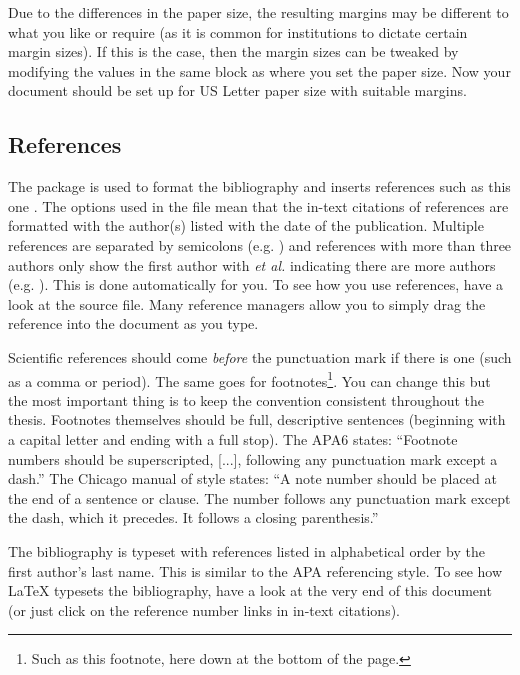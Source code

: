 Due to the differences in the paper size, the resulting margins may be different to what you like or require (as it is common for institutions to dictate certain margin sizes). If this is the case, then the margin sizes can be tweaked by modifying the values in the same block as where you set the paper size. Now your document should be set up for US Letter paper size with suitable margins.

\subsection{References}

The  package is used to format the bibliography and inserts references such as this one \parencite{Reference1}. The options used in the  file mean that the in-text citations of references are formatted with the author(s) listed with the date of the publication. Multiple references are separated by semicolons (e.g. \parencite{Reference2, Reference1}) and references with more than three authors only show the first author with \emph{et al.} indicating there are more authors (e.g. \parencite{Reference3}). This is done automatically for you. To see how you use references, have a look at the  source file. Many reference managers allow you to simply drag the reference into the document as you type.

Scientific references should come \emph{before} the punctuation mark if there is one (such as a comma or period). The same goes for footnotes\footnote{Such as this footnote, here down at the bottom of the page.}. You can change this but the most important thing is to keep the convention consistent throughout the thesis. Footnotes themselves should be full, descriptive sentences (beginning with a capital letter and ending with a full stop). The APA6 states: \enquote{Footnote numbers should be superscripted, [...], following any punctuation mark except a dash.} The Chicago manual of style states: \enquote{A note number should be placed at the end of a sentence or clause. The number follows any punctuation mark except the dash, which it precedes. It follows a closing parenthesis.}

The bibliography is typeset with references listed in alphabetical order by the first author's last name. This is similar to the APA referencing style. To see how \LaTeX{} typesets the bibliography, have a look at the very end of this document (or just click on the reference number links in in-text citations).

